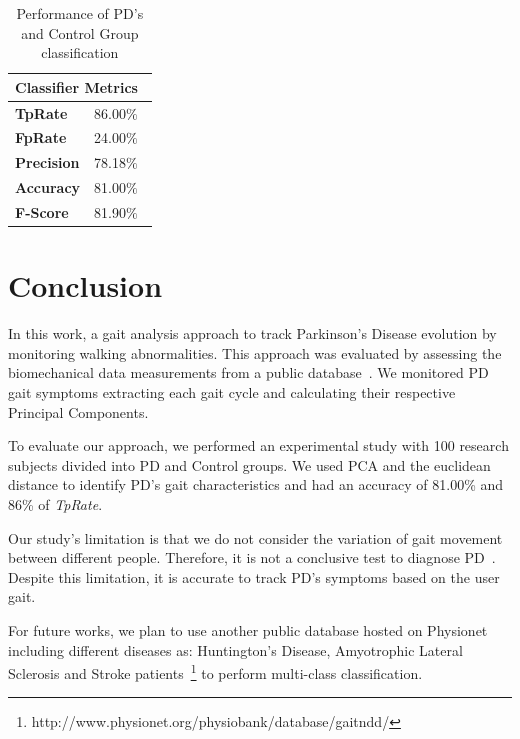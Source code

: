 \documentclass[10pt, conference, compsocconf]{IEEEtran}
\begin{document}
\begin{table}[htbp!]
\caption{Performance of PD's and Control Group classification}
\label{table:metricas}
\centering
\begin{tabular}{|l|r|}
\hline
\multicolumn{2}{|l|}{\textbf{Classifier Metrics}} \\ \hline
\textbf{TpRate}                    & 86.00$\%$\                 \\ \hline
\textbf{FpRate}                    & 24.00$\%$\                \\ \hline
\textbf{Precision}                 & 78.18$\%$\                \\ \hline
\textbf{Accuracy}                  & 81.00$\%$\                \\ \hline
\textbf{F-Score}                 & 81.90$\%$\                \\ \hline
\end{tabular}
\end{table}


\section{Conclusion}\label{sec:conclusion}

In this work, a gait analysis approach to track Parkinson's Disease evolution by monitoring walking abnormalities. This approach was evaluated by assessing the biomechanical data measurements from a public database~\cite{physionet}. We monitored PD gait symptoms extracting each gait cycle and calculating their respective Principal Components.  

To evaluate our approach, we performed an experimental study with 100 research subjects divided into PD and Control groups. We used PCA and the euclidean distance to identify PD's gait characteristics and had an accuracy of 81.00\% and 86\% of \textit{TpRate}. 

Our study's limitation is that we do not consider the variation of gait movement between different people. Therefore, it is not a conclusive test to diagnose PD~\cite{gaitusingsensorsreview2012, national2006parkinson}. Despite this limitation, it is accurate to track PD's symptoms based on the user gait.

For future works, we plan to use another public database hosted on Physionet~\cite{physionet} including different diseases as: Huntington's Disease, Amyotrophic Lateral Sclerosis and Stroke patients~\footnote{http://www.physionet.org/physiobank/database/gaitndd/} to perform multi-class classification. 
\end{document}
